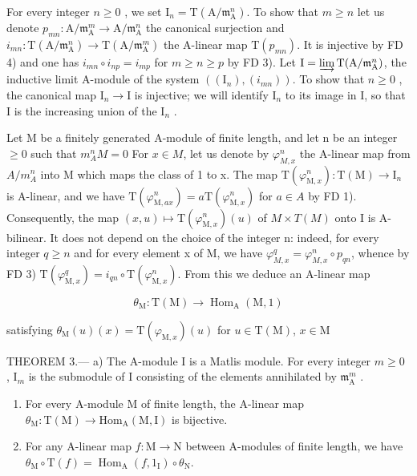 For every integer \(n \geqslant 0\) , we set \(\mathrm{I}_{n} = \mathrm{T}(\mathrm{A}/\mathfrak{m}_{\mathrm{A}}^{n})\). To show that \(m \geqslant n\) let us denote \(p_{mn}: \mathrm{A}/\mathfrak{m}_{\mathrm{A}}^{m} \longrightarrow \mathrm{A}/\mathfrak{m}_{\mathrm{A}}^{n}\) the canonical surjection and \(i_{mn}: \mathrm{T}(\mathrm{A}/\mathfrak{m}_{\mathrm{A}}^{n}) \longrightarrow \mathrm{T}(\mathrm{A}/\mathfrak{m}_{\mathrm{A}}^{m})\) the A-linear map \(\mathrm{T}(p_{mn})\). It is injective by FD 4) and one has \(i_{mn} \circ i_{np} = i_{mp}\) for \(m \geqslant n \geqslant p\) by FD 3). Let \(\mathrm{I} = \varinjlim \mathrm{T}(\mathrm{A}/\mathfrak{m}_{\mathrm{A}}^{n})\), the inductive limit A-module of the system \(((\mathrm{I}_{n}), (i_{mn}))\). To show that \(n \geqslant 0\) , the canonical map \(\mathrm{I}_{n} \to \mathrm{I}\) is injective; we will identify \(\mathrm{I}_{n}\) to its image in I, so that I is the increasing union of the \(\mathrm{I}_{n}\) .

Let M be a finitely generated A-module of finite length, and let n be an integer \(\geqslant0\) such that \(m_{A}^{n}M=0\) For \(x\in M\), let us denote by \(\varphi_{M,x}^{n}\) the A-linear map from \(A/m_{A}^{n}\) into M which maps the class of 1 to x. The map \(\mathrm{T}(\varphi_{\mathrm{M},x}^{n}):\mathrm{T}(\mathrm{M})\to\mathrm{I}_{n}\) is A-linear, and we have \(\mathrm{T}(\varphi_{\mathrm{M},ax}^{n})=a\mathrm{T}(\varphi_{\mathrm{M},x}^{n})\) for \(a\in A\) by FD 1). Consequently, the map \((x,u)\mapsto\mathrm{T}(\varphi_{\mathrm{M},x}^{n})(u)\) of \(M\times T(M)\) onto I is A-bilinear. It does not depend on the choice of the integer n: indeed, for every integer \(q\geqslant n\) and for every element x of M, we have \(\varphi_{M,x}^{q}=\varphi_{M,x}^{n}\circ p_{qn}\), whence by FD 3) \(\mathrm{T}(\varphi_{\mathrm{M},x}^{q})=i_{qn}\circ\mathrm{T}(\varphi_{\mathrm{M},x}^{n})\). From this we deduce an A-linear map

\[
\theta_ {\mathrm{M}}: \mathrm{T} (\mathrm{M}) \longrightarrow \operatorname{Hom} _ {\mathrm{A}} (\mathrm{M}, 1)
\]

satisfying \(\theta_{\mathrm{M}}(u)(x) = \mathrm{T}(\varphi_{\mathrm{M},x})(u)\) for \(u\in \mathrm{T}(\mathrm{M})\), \(x\in \mathrm{M}\)

THEOREM 3.--- a) The A-module I is a Matlis module. For every integer \(m \geqslant 0\) , \(\mathrm{I}_{m}\) is the submodule of I consisting of the elements annihilated by \(\mathfrak{m}_{\mathrm{A}}^{m}\) .

\begin{enumerate}
\def\labelenumi{\alph{enumi})}
\setcounter{enumi}{1}
\item
  For every A-module M of finite length, the A-linear map \(\theta_{\mathrm{M}}: \mathrm{T}(\mathrm{M}) \longrightarrow \mathrm{Hom}_{\mathrm{A}}(\mathrm{M}, \mathrm{I})\) is bijective.
\item
  For any A-linear map \(f: \mathrm{M} \to \mathrm{N}\) between A-modules of finite length, we have \(\theta_{\mathrm{M}} \circ \mathrm{T}(f) = \operatorname{Hom}_{\mathrm{A}}(f, 1_{\mathrm{I}}) \circ \theta_{\mathrm{N}}\).
\end{enumerate}

